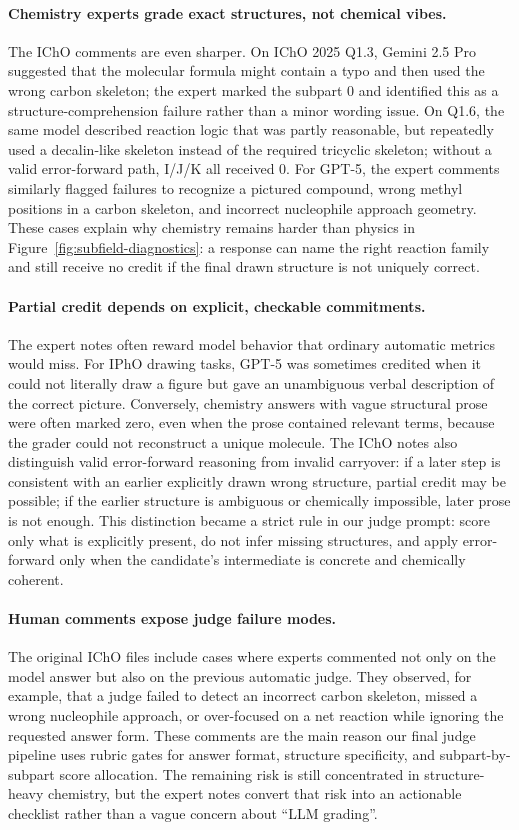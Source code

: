 \documentclass[11pt]{article}
\begin{document}
\paragraph{Chemistry experts grade exact structures, not chemical vibes.}
The IChO comments are even sharper.
On IChO 2025 Q1.3, Gemini 2.5 Pro suggested that the molecular formula might contain a typo and then used the wrong carbon skeleton; the expert marked the subpart 0 and identified this as a structure-comprehension failure rather than a minor wording issue.
On Q1.6, the same model described reaction logic that was partly reasonable, but repeatedly used a decalin-like skeleton instead of the required tricyclic skeleton; without a valid error-forward path, I/J/K all received 0.
For GPT-5, the expert comments similarly flagged failures to recognize a pictured compound, wrong methyl positions in a carbon skeleton, and incorrect nucleophile approach geometry.
These cases explain why chemistry remains harder than physics in Figure~\ref{fig:subfield-diagnostics}: a response can name the right reaction family and still receive no credit if the final drawn structure is not uniquely correct.

\paragraph{Partial credit depends on explicit, checkable commitments.}
The expert notes often reward model behavior that ordinary automatic metrics would miss.
For IPhO drawing tasks, GPT-5 was sometimes credited when it could not literally draw a figure but gave an unambiguous verbal description of the correct picture.
Conversely, chemistry answers with vague structural prose were often marked zero, even when the prose contained relevant terms, because the grader could not reconstruct a unique molecule.
The IChO notes also distinguish valid error-forward reasoning from invalid carryover: if a later step is consistent with an earlier explicitly drawn wrong structure, partial credit may be possible; if the earlier structure is ambiguous or chemically impossible, later prose is not enough.
This distinction became a strict rule in our judge prompt: score only what is explicitly present, do not infer missing structures, and apply error-forward only when the candidate's intermediate is concrete and chemically coherent.

\paragraph{Human comments expose judge failure modes.}
The original IChO files include cases where experts commented not only on the model answer but also on the previous automatic judge.
They observed, for example, that a judge failed to detect an incorrect carbon skeleton, missed a wrong nucleophile approach, or over-focused on a net reaction while ignoring the requested answer form.
These comments are the main reason our final judge pipeline uses rubric gates for answer format, structure specificity, and subpart-by-subpart score allocation.
The remaining risk is still concentrated in structure-heavy chemistry, but the expert notes convert that risk into an actionable checklist rather than a vague concern about ``LLM grading''.
\end{document}
